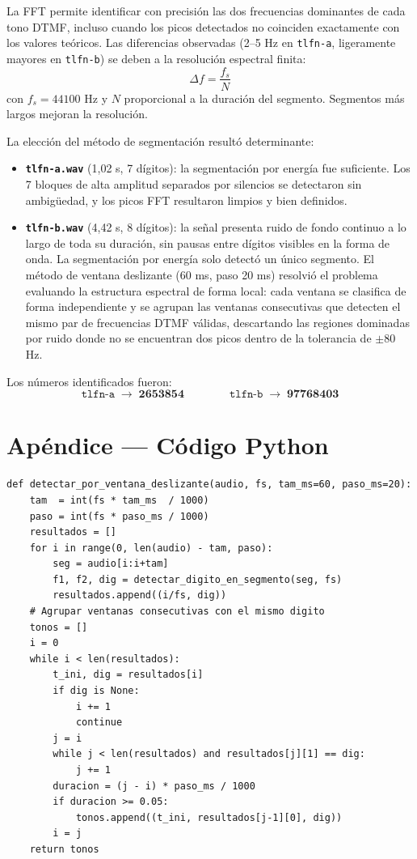 \documentclass[]{report}
\begin{document}
La FFT permite identificar con precisión las dos frecuencias dominantes de cada tono DTMF, incluso cuando los picos detectados no coinciden exactamente con los valores teóricos. Las diferencias observadas (2–5 Hz en \texttt{tlfn-a}, ligeramente mayores en \texttt{tlfn-b}) se deben a la resolución espectral finita:
$$
\Delta f = \frac{f_s}{N}
$$
con $f_s = 44100$ Hz y $N$ proporcional a la duración del segmento. Segmentos más largos mejoran la resolución.

La elección del método de segmentación resultó determinante:

\begin{itemize}
  \item \textbf{\texttt{tlfn-a.wav}} (1{,}02 s, 7 dígitos): la segmentación por energía fue suficiente. Los 7 bloques de alta amplitud separados por silencios se detectaron sin ambigüedad, y los picos FFT resultaron limpios y bien definidos.

  \item \textbf{\texttt{tlfn-b.wav}} (4{,}42 s, 8 dígitos): la señal presenta ruido de fondo continuo a lo largo de toda su duración, sin pausas entre dígitos visibles en la forma de onda. La segmentación por energía solo detectó un único segmento. El método de ventana deslizante (60 ms, paso 20 ms) resolvió el problema evaluando la estructura espectral de forma local: cada ventana se clasifica de forma independiente y se agrupan las ventanas consecutivas que detecten el mismo par de frecuencias DTMF válidas, descartando las regiones dominadas por ruido donde no se encuentran dos picos dentro de la tolerancia de $\pm 80$ Hz.
\end{itemize}

Los números identificados fueron:
\[
\texttt{tlfn-a} \;\rightarrow\; \mathbf{2653854} \qquad\qquad \texttt{tlfn-b} \;\rightarrow\; \mathbf{97768403}
\]

\appendix
\section*{Apéndice — Código Python}

\begin{lstlisting}[caption={Detección DTMF con ventana deslizante (fragmento clave).}]
def detectar_por_ventana_deslizante(audio, fs, tam_ms=60, paso_ms=20):
    tam  = int(fs * tam_ms  / 1000)
    paso = int(fs * paso_ms / 1000)
    resultados = []
    for i in range(0, len(audio) - tam, paso):
        seg = audio[i:i+tam]
        f1, f2, dig = detectar_digito_en_segmento(seg, fs)
        resultados.append((i/fs, dig))
    # Agrupar ventanas consecutivas con el mismo digito
    tonos = []
    i = 0
    while i < len(resultados):
        t_ini, dig = resultados[i]
        if dig is None:
            i += 1
            continue
        j = i
        while j < len(resultados) and resultados[j][1] == dig:
            j += 1
        duracion = (j - i) * paso_ms / 1000
        if duracion >= 0.05:
            tonos.append((t_ini, resultados[j-1][0], dig))
        i = j
    return tonos
\end{lstlisting}
\end{document}
